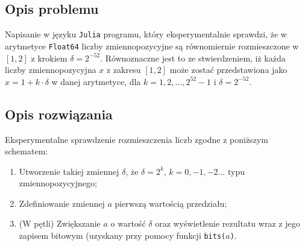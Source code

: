 \documentclass{classrep}
\begin{document}
	\subsection{Opis problemu}
		Napisanie w języku \texttt{Julia} programu, który eksperymentalnie sprawdzi, że w arytmetyce 
		\texttt{Float64} liczby zmiennopozycyjne są równomiernie rozmieszczone w $[1,2]$ z krokiem $\delta = 
		2^{-52}$. Równoznaczne jest to ze stwierdzeniem, iż każda liczby zmiennopozycyjna $x$ z zakresu 
		$[1,2]$ może zostać przedstawiona jako $x = 1 + k \cdot \delta$ w danej arytmetyce, dla 
		$k = 1,2,\dots,2^{52}-1$ i $\delta = 2^{-52}$.
	\subsection{Opis rozwiązania}
		Eksperymentalne sprawdzenie rozmieszczenia liczb zgodne z poniższym schematem:
		\begin{enumerate}
			\item Utworzenie takiej zmiennej $\delta$, że $\delta = 2^{k}$, $k = 0,-1,-2\dots $ typu 
			zmiennopozycyjnego;
			\item Zdefiniowanie zmiennej $a$ pierwszą wartością przedziału;
			\item (W pętli) Zwiększanie $a$ o wartość $\delta$ oraz wyświetlenie rezultatu
			wraz z jego zapisem bitowym (uzyskany przy pomocy funkcji \texttt{bits($a$)}.
		\end{enumerate}
\end{document}
